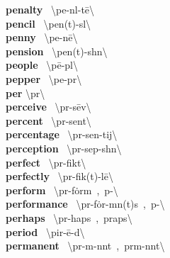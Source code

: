 \documentclass[10pt,a4paper]{article}
\begin{document}
\begin{multicols}{2}
\textbf{ penalty }\quad \ \textbackslash \textprimstress pe-n\textsuperscript{\textreve}l-t\={e}\textbackslash \\
\textbf{ pencil }\quad \ \textbackslash \textprimstress pen(t)-s\textschwa l\textbackslash \\
\textbf{ penny }\quad \ \textbackslash \textprimstress pe-n\={e}\textbackslash \\
\textbf{ pension }\quad \ \textbackslash \textprimstress pen(t)-sh\textschwa n\textbackslash \\
\textbf{ people }\quad \ \textbackslash \textprimstress p\={e}-p\textschwa l\textbackslash \\
\textbf{ pepper }\quad \ \textbackslash \textprimstress pe-p\textschwa r\textbackslash \\
\textbf{ per }\quad \textbackslash \textprimstress p\textschwa r\textbackslash \\
\textbf{ perceive }\quad \ \textbackslash p\textschwa r-\textprimstress s\={e}v\textbackslash \\
\textbf{ percent }\quad \ \textbackslash p\textschwa r-\textprimstress sent\textbackslash \\
\textbf{ percentage }\quad \ \textbackslash p\textschwa r-\textprimstress sen-tij\textbackslash \\
\textbf{ perception }\quad \ \textbackslash p\textschwa r-\textprimstress sep-sh\textschwa n\textbackslash \\
\textbf{ perfect }\quad \ \textbackslash \textprimstress p\textschwa r-fikt\textbackslash \\
\textbf{ perfectly }\quad \ \textbackslash \textprimstress p\textschwa r-fik(t)-l\={e}\textbackslash \\
\textbf{ perform }\quad \ \textbackslash p\textschwa r-\textprimstress f\.{o}rm\ ,\ p\textschwa -\textbackslash \\
\textbf{ performance }\quad \ \textbackslash p\textschwa r-\textprimstress f\.{o}r-m\textschwa n(t)s\ ,\ p\textschwa -\textbackslash \\
\textbf{ perhaps }\quad \ \textbackslash p\textschwa r-\textprimstress haps\ ,\ \textprimstress praps\textbackslash \\
\textbf{ period }\quad \ \textbackslash \textprimstress pir-\={e}-\textschwa d\textbackslash \\
\textbf{ permanent }\quad \ \textbackslash \textprimstress p\textschwa r-m\textschwa -n\textschwa nt\ ,\ \textprimstress p\textschwa rm-n\textschwa nt\textbackslash \\

\end{multicols}
\end{document}

